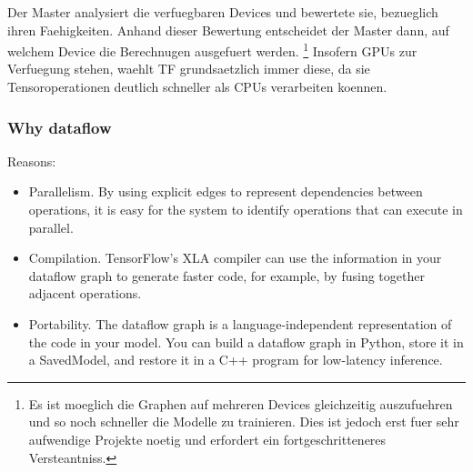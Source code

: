 Der Master analysiert die verfuegbaren Devices und bewertete sie, bezueglich
ihren Faehigkeiten. Anhand dieser Bewertung entscheidet der Master dann, auf
welchem Device die Berechnugen ausgefuert werden.
\footnote{
  Es ist moeglich die Graphen auf mehreren Devices gleichzeitig auszufuehren und
  so noch schneller die Modelle zu trainieren. Dies ist jedoch erst fuer sehr
  aufwendige Projekte noetig und erfordert ein fortgeschritteneres Versteantniss.
}
Insofern GPUs zur Verfuegung stehen, waehlt TF grundsaetzlich immer diese, da
sie Tensoroperationen deutlich schneller als CPUs verarbeiten koennen.

\subsubsection{Why dataflow}
Reasons:
\begin{itemize}
\item{Parallelism. By using explicit edges to represent dependencies between operations, it is easy for the system to identify operations that can execute in parallel.}
\item{Compilation. TensorFlow's XLA compiler can use the information in your dataflow graph to generate faster code, for example, by fusing together adjacent operations.}
\item{Portability. The dataflow graph is a language-independent representation of the code in your model. You can build a dataflow graph in Python, store it in a SavedModel, and restore it in a C++ program for low-latency inference.}
\end{itemize}

